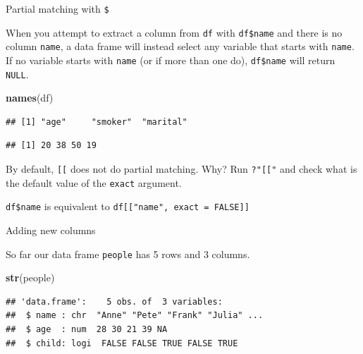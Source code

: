 \documentclass[ignorenonframetext,]{beamer}
\newenvironment{Shaded}{\begin{snugshade}}{\end{snugshade}}
\newcommand{\KeywordTok}[1]{\textcolor[rgb]{0.13,0.29,0.53}{\textbf{#1}}}
\newcommand{\NormalTok}[1]{#1}
\newcommand{\OperatorTok}[1]{\textcolor[rgb]{0.81,0.36,0.00}{\textbf{#1}}}
\begin{document}
\begin{frame}[fragile]{Partial matching with \texttt{\$}}
\protect\hypertarget{partial-matching-with}{}

When you attempt to extract a column from \texttt{df} with
\texttt{df\$name} and there is no column \texttt{name}, a data frame
will instead select any variable that starts with \texttt{name}. If no
variable starts with \texttt{name} (or if more than one do),
\texttt{df\$name} will return \texttt{NULL}.

\begin{Shaded}
\begin{Highlighting}[]
\KeywordTok{names}\NormalTok{(df)}
\end{Highlighting}
\end{Shaded}

\begin{verbatim}
## [1] "age"     "smoker"  "marital"
\end{verbatim}

\begin{Shaded}
\end{Shaded}

\begin{verbatim}
## [1] 20 38 50 19
\end{verbatim}

By default, \texttt{{[}{[}} does not do partial matching. Why? Run
\texttt{?"{[}{[}"} and check what is the default value of the
\texttt{exact} argument.

\texttt{df\$name} is equivalent to
\texttt{df{[}{[}"name",\ exact\ =\ FALSE{]}{]}}

\end{frame}

\begin{frame}[fragile]{Adding new columns}
\protect\hypertarget{adding-new-columns}{}

So far our data frame \texttt{people} has 5 rows and 3 columns.

\begin{Shaded}
\begin{Highlighting}[]
\KeywordTok{str}\NormalTok{(people)}
\end{Highlighting}
\end{Shaded}

\begin{verbatim}
## 'data.frame':    5 obs. of  3 variables:
##  $ name : chr  "Anne" "Pete" "Frank" "Julia" ...
##  $ age  : num  28 30 21 39 NA
##  $ child: logi  FALSE FALSE TRUE FALSE TRUE
\end{verbatim}

\end{frame}
\end{document}
